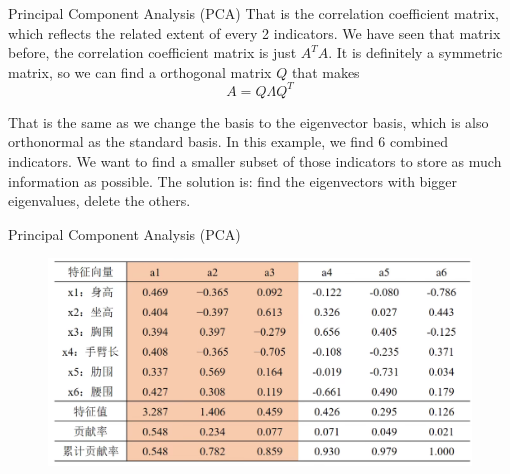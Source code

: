 \documentclass{beamer}
\begin{document}
\begin{frame}{Principal Component Analysis (PCA)}
That is the correlation coefficient matrix, which reflects the related extent of every 2 indicators. We have seen that matrix before, the correlation coefficient matrix is just $A^TA$. It is definitely a symmetric matrix, so we can find a orthogonal matrix $Q$ that makes
\begin{equation*}
    A=Q\varLambda Q^{T}
\end{equation*}

That is the same as we change the basis to the eigenvector basis, which is also orthonormal as the standard basis. In this example, we find 6 combined indicators. We want to find a smaller subset of those indicators to store as much information as possible. The solution is: find the eigenvectors with bigger eigenvalues, delete the others.

\end{frame}

\begin{frame}{Principal Component Analysis (PCA)}
\begin{figure}
    \includegraphics[width=\textwidth]{eig.png}
\end{figure}
\end{frame}
\end{document}
